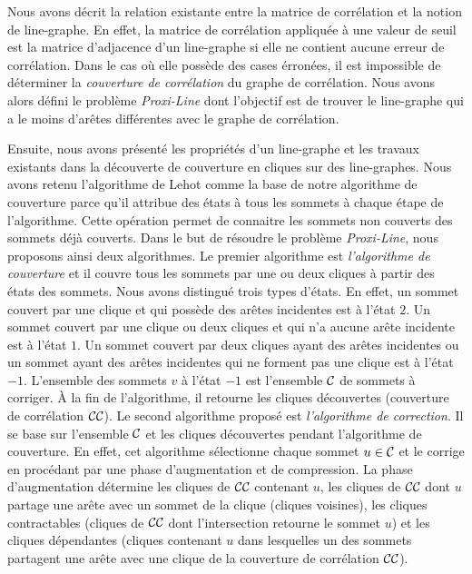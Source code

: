 Nous avons d\'ecrit la relation existante entre la matrice de corr\'elation et la notion de line-graphe. En effet, la matrice de corr\'elation appliqu\'ee \`a une valeur de seuil est la matrice d'adjacence d'un line-graphe si elle ne contient aucune erreur de corr\'elation.  Dans le cas o\`u elle poss\`ede des cases \'erron\'ees, il est impossible de d\'eterminer la {\em couverture de corr\'elation} du graphe de corr\'elation. Nous avons alors d\'efini le probl\`eme {\em Proxi-Line} dont l'objectif est de trouver le line-graphe  qui a le moins d'ar\^etes diff\'erentes avec le graphe de corr\'elation.  
\newline

Ensuite, nous avons pr\'esent\'e les propri\'et\'es d'un line-graphe et les travaux existants dans la d\'ecouverte de couverture en cliques sur des line-graphes. Nous avons retenu l'algorithme de Lehot \cite{decompositionEnCliques} comme la base de notre algorithme de couverture parce qu'il attribue  des \'etats \`a tous les sommets \`a chaque \'etape de l'algorithme. Cette op\'eration permet de connaitre les sommets non couverts des sommets d\'ej\`a couverts. 
\newline
Dans le but de r\'esoudre le probl\`eme {\em Proxi-Line}, nous proposons ainsi deux algorithmes. 
\newline
Le premier algorithme est {\em l'algorithme de couverture} et il couvre tous les sommets par une ou deux cliques \`a partir des \'etats des sommets. Nous avons distingu\'e trois types d'\'etats.
En effet, un sommet couvert par une clique et qui poss\`ede des ar\^etes incidentes est \`a l'\'etat  $2$. Un sommet couvert par une clique ou deux cliques et qui n'a aucune ar\^ete incidente est \`a l'\'etat $1$. Un sommet couvert par deux cliques ayant des ar\^etes incidentes ou un sommet ayant des ar\^etes incidentes qui ne forment pas une clique est \`a l'\'etat $-1$. 
L'ensemble des sommets $v$ \`a l'\'etat $-1$ est l'ensemble $\cal C$ de sommets \`a corriger. \`A la fin de l'algorithme, il retourne les cliques d\'ecouvertes (couverture de corr\'elation $\cal CC$). 
\newline
Le second algorithme propos\'e est {\em l'algorithme de correction}. Il se base sur l'ensemble $\cal C$ et les cliques d\'ecouvertes pendant l'algorithme de couverture. 
En effet, cet algorithme s\'electionne chaque sommet $u \in \cal C$ et le corrige en proc\'edant par une phase d'augmentation et de compression.
La phase d'augmentation d\'etermine les cliques de $\cal CC$ contenant $u$, les cliques de $\cal CC$  dont $u$ partage une ar\^ete avec un sommet de la clique (cliques voisines), les cliques contractables (cliques de $\cal CC$ dont l'intersection retourne le sommet $u$) et les cliques d\'ependantes (cliques contenant $u$ dans lesquelles un des sommets partagent une ar\^ete avec une clique de la couverture  de corr\'elation $\cal CC$). 
